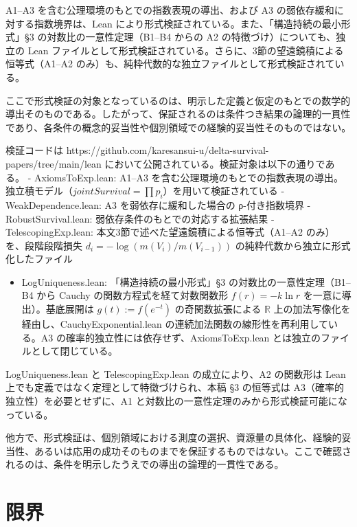 \documentclass[12pt,a4paper]{article}
\begin{document}
A1--A3 を含む公理環境のもとでの指数表現の導出、および A3 の弱依存緩和に対する指数境界は、Lean により形式検証されている。また、「構造持続の最小形式」§3 の対数比の一意性定理（B1--B4 からの A2 の特徴づけ）についても、独立の Lean ファイルとして形式検証されている。さらに、3節の望遠鏡積による恒等式（A1--A2 のみ）も、純粋代数的な独立ファイルとして形式検証されている。

ここで形式検証の対象となっているのは、明示した定義と仮定のもとでの数学的導出そのものである。したがって、保証されるのは条件つき結果の論理的一貫性であり、各条件の概念的妥当性や個別領域での経験的妥当性そのものではない。

検証コードは https://github.com/karesansui-u/delta-survival-papers/tree/main/lean において公開されている。検証対象は以下の通りである。 - AxiomsToExp.lean: A1--A3 を含む公理環境のもとでの指数表現の導出。独立積モデル（\(jointSurvival = \prod p_{i}\)）を用いて検証されている - WeakDependence.lean: A3 を弱依存に緩和した場合の ρ-付き指数境界 - RobustSurvival.lean: 弱依存条件のもとでの対応する拡張結果 - TelescopingExp.lean: 本文3節で述べた望遠鏡積による恒等式（A1--A2 のみ）を、段階段階損失 \(d_i = -\log(m(V_i)/m(V_{i-1}))\) の純粋代数から独立に形式化したファイル

\begin{itemize}
\tightlist
\item
  LogUniqueness.lean: 「構造持続の最小形式」§3 の対数比の一意性定理（B1--B4 から Cauchy の関数方程式を経て対数関数形 \(f(r) = -k \ln r\) を一意に導出）。基底展開は \(g(t) := f(e^{-t})\) の奇関数拡張による \(\mathbb{R}\) 上の加法写像化を経由し、CauchyExponential.lean の連続加法関数の線形性を再利用している。A3 の確率的独立性には依存せず、AxiomsToExp.lean とは独立のファイルとして閉じている。
\end{itemize}

LogUniqueness.lean と TelescopingExp.lean の成立により、A2 の関数形は Lean 上でも定義ではなく定理として特徴づけられ、本稿 §3 の恒等式は A3（確率的独立性）を必要とせずに、A1 と対数比の一意性定理のみから形式検証可能になっている。

他方で、形式検証は、個別領域における測度の選択、資源量の具体化、経験的妥当性、あるいは応用の成功そのものまでを保証するものではない。ここで確認されるのは、条件を明示したうえでの導出の論理的一貫性である。

\section{限界}\label{ux9650ux754c}
\end{document}
